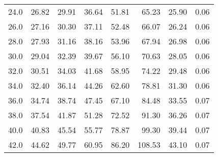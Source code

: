 \begin{tabular}{lrrrrrrr}
24.0 &                            26.82 &                            29.91 &                            36.64 &                            51.81 &                              65.23 &                            25.90 &        0.06 \\
26.0 &                            27.16 &                            30.30 &                            37.11 &                            52.48 &                              66.07 &                            26.24 &        0.06 \\
28.0 &                            27.93 &                            31.16 &                            38.16 &                            53.96 &                              67.94 &                            26.98 &        0.06 \\
30.0 &                            29.04 &                            32.39 &                            39.67 &                            56.10 &                              70.63 &                            28.05 &        0.06 \\
32.0 &                            30.51 &                            34.03 &                            41.68 &                            58.95 &                              74.22 &                            29.48 &        0.06 \\
34.0 &                            32.40 &                            36.14 &                            44.26 &                            62.60 &                              78.81 &                            31.30 &        0.06 \\
36.0 &                            34.74 &                            38.74 &                            47.45 &                            67.10 &                              84.48 &                            33.55 &        0.07 \\
38.0 &                            37.54 &                            41.87 &                            51.28 &                            72.52 &                              91.30 &                            36.26 &        0.07 \\
40.0 &                            40.83 &                            45.54 &                            55.77 &                            78.87 &                              99.30 &                            39.44 &        0.07 \\
42.0 &                            44.62 &                            49.77 &                            60.95 &                            86.20 &                             108.53 &                            43.10 &        0.07 \\

\end{tabular}
